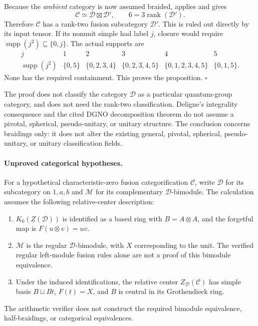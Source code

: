 \documentclass[11pt]{article}
\begin{document}
Because the \emph{ambient} category is now assumed braided,
\cite[Theorem 3.13]{DGNO} applies and gives
\[
 \mathcal C\simeq\mathcal D\boxtimes\mathcal D',
 \qquad 6=3\operatorname{rank}(\mathcal D').
\]
Therefore $\mathcal C$ has a rank-two fusion subcategory $\mathcal D'$.
This is ruled out directly by its input tensor. If its nonunit simple
had label $j$, closure would require
$\operatorname{supp}(j^2)\subseteq\{0,j\}$. The actual supports are
\[
\begin{array}{c|ccccc}
j&1&2&3&4&5\\\hline
\operatorname{supp}(j^2)&
\{0,5\}&\{0,2,3,4\}&\{0,2,3,4,5\}&
\{0,1,2,3,4,5\}&\{0,1,5\}.
\end{array}
\]
None has the required containment. This proves the proposition.
\hfill$\square$

The proof does not classify the category $\mathcal D$ as a particular
quantum-group category, and does not need the rank-two classification.
Deligne's integrality consequence and the cited DGNO decomposition
theorem do not assume a pivotal, spherical, pseudo-unitary, or unitary
structure. The conclusion concerns braidings only: it does not alter
the existing general, pivotal, spherical, pseudo-unitary, or unitary
classification fields.

\paragraph{Unproved categorical hypotheses.}
For a hypothetical characteristic-zero fusion categorification
$\mathcal C$, write $\mathcal D$ for its subcategory on $1,a,b$ and
$\mathcal M$ for its complementary $\mathcal D$-bimodule.
The calculation assumes the following relative-center description:
\begin{enumerate}
\item $K_0(Z(\mathcal D))$ is identified as a based ring with
$B=A\otimes A$, and the forgetful map is
$F(u\otimes v)=uv$.
\item $\mathcal M$ is the regular $\mathcal D$-bimodule, with $X$
corresponding to the unit. The verified regular left-module fusion
rules alone are not a proof of this bimodule equivalence.
\item Under the induced identifications, the relative center
$Z_{\mathcal D}(\mathcal C)$ has simple basis $B\sqcup Bt$,
$F(t)=X$, and $B$ is central in its Grothendieck ring.
\end{enumerate}
The arithmetic verifier does not construct the required bimodule
equivalence, half-braidings, or categorical equivalences.
\end{document}
